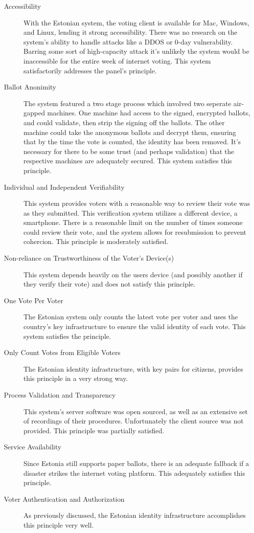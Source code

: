 \documentclass[a4paper, 11pt]{article} %
\begin{document}
\begin{description}
    \item[Accessibility] With the Estonian system, the voting client is available for Mac, Windows, and Linux, lending it strong accessibility. There was no research on the system's ability to handle attacks like a DDOS or 0-day vulnerability. Barring some sort of high-capacity attack it's unlikely the system would be inaccessible for the entire week of internet voting. This system satisfactorily addresses the panel's principle.
    \item[Ballot Anonimity] The system featured a two stage process which involved two seperate air-gapped machines. One machine had access to the signed, encrypted ballots, and could validate, then strip the signing off the ballots. The other machine could take the anonymous ballots and decrypt them, ensuring that by the time the vote is counted, the identity has been removed. It's necessary for there to be some trust (and perhaps validation) that the respective machines are adequately secured. This system satisfies this principle.
    \item[Individual and Independent Verifiability] This system provides voters with a reasonable way to review their vote was as they submitted. This verification system utilizes a different device, a smartphone. There is a reasonable limit on the number of times someone could review their vote, and the system allows for resubmission to prevent cohercion. This principle is moderately satisfied.
    \item[Non-reliance on Trustworthiness of the Voter’s Device(s)] This system depends heavily on the users device (and possibly another if they verify their vote) and does not satisfy this principle.
    \item[One Vote Per Voter] The Estonian system only counts the latest vote per voter and uses the country's key infrastructure to ensure the valid identity of each vote. This system satisfies the principle.
    \item[Only Count Votes from Eligible Voters] The Estonian identity infrastructure, with key pairs for citizens, provides this principle in a very strong way.
    \item[Process Validation and Transparency] This system's server software was open sourced, as well as an extensive set of recordings of their procedures. Unfortunately the client source was not provided. This principle was partially satisfied.
    \item[Service Availability] Since Estonia still supports paper ballots, there is an adequate fallback if a disaster strikes the internet voting platform. This adequately satisfies this principle.
    \item[Voter Authentication and Authorization] As previously discussed, the Estonian identity infrastructure accomplishes this principle very well.
\end{description}
\end{document}
